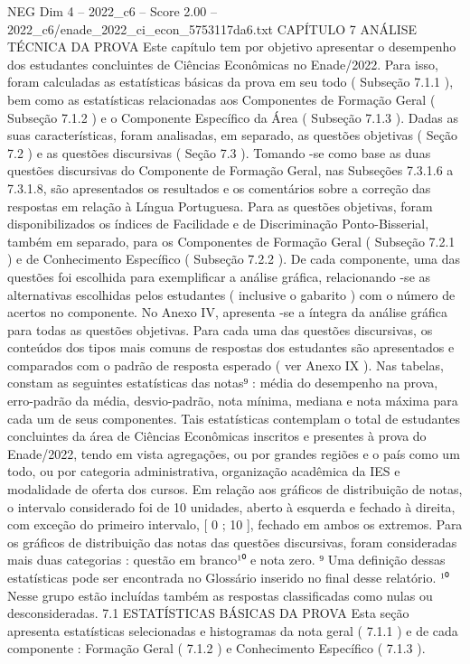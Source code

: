\begin{textsample}{NEG Dim 4 – 2022\_c6 – Score 2.00 – 2022\_c6/enade\_2022\_ci\_econ\_5753117da6.txt}  \label{ex:f4_neg_276}
CAPÍTULO 7 ANÁLISE TÉCNICA DA PROVA Este capítulo tem por objetivo apresentar o desempenho dos estudantes concluintes de Ciências Econômicas no Enade/2022.
Para isso, foram calculadas as estatísticas básicas da prova em seu todo ( Subseção 7.1.1 ), bem como as estatísticas relacionadas aos Componentes de Formação Geral ( Subseção 7.1.2 ) e o Componente Específico da Área ( Subseção 7.1.3 ).
Dadas as suas características, foram analisadas, em separado, as questões objetivas ( Seção 7.2 ) e as questões discursivas ( Seção 7.3 ).
Tomando -se como base as duas questões discursivas do Componente de Formação Geral, nas Subseções 7.3.1.6 a 7.3.1.8, são apresentados os resultados e os comentários sobre a correção das respostas em relação à Língua Portuguesa.
Para as questões objetivas, foram disponibilizados os índices de Facilidade e de Discriminação Ponto-Bisserial, também em separado, para os Componentes de Formação Geral ( Subseção 7.2.1 ) e de Conhecimento Específico ( Subseção 7.2.2 ).
De cada componente, uma das questões foi escolhida para exemplificar a análise gráfica, relacionando -se as alternativas escolhidas pelos estudantes ( inclusive o gabarito ) com o número de acertos no componente.
No Anexo IV, apresenta -se a íntegra da análise gráfica para todas as questões objetivas.
Para cada uma das questões discursivas, os conteúdos dos tipos mais comuns de respostas dos estudantes são apresentados e comparados com o padrão de resposta esperado ( ver Anexo IX ).
Nas tabelas, constam as seguintes estatísticas das notas⁹ : média do desempenho na prova, erro-padrão da média, desvio-padrão, nota mínima, mediana e nota máxima para cada um de seus componentes.
Tais estatísticas contemplam o total de estudantes concluintes da área de Ciências Econômicas inscritos e presentes à prova do Enade/2022, tendo em vista agregações, ou por grandes regiões e o país como um todo, ou por categoria administrativa, organização acadêmica da IES e modalidade de oferta dos cursos.
Em relação aos gráficos de distribuição de notas, o intervalo considerado foi de 10 unidades, aberto à esquerda e fechado à direita, com exceção do primeiro intervalo, [ 0 ; 10 ], fechado em ambos os extremos.
Para os gráficos de distribuição das notas das questões discursivas, foram consideradas mais duas categorias : questão em branco¹⁰ e nota zero. ⁹ Uma definição dessas estatísticas pode ser encontrada no Glossário inserido no final desse relatório. ¹⁰ Nesse grupo estão incluídas também as respostas classificadas como nulas ou desconsideradas. 7.1 ESTATÍSTICAS BÁSICAS DA PROVA Esta seção apresenta estatísticas selecionadas e histogramas da nota geral ( 7.1.1 ) e de cada componente : Formação Geral ( 7.1.2 ) e Conhecimento Específico ( 7.1.3 ).

\end{textsample}
